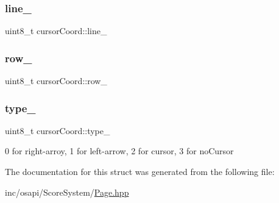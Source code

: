 \mbox{\label{structcursor_coord_a96ae7079d4b13f2db265984e8bdfaea7}} 
\subsubsection{\texorpdfstring{line\+\_\+}{line\_}}
{\footnotesize\ttfamily uint8\+\_\+t cursor\+Coord\+::line\+\_\+}

\mbox{\label{structcursor_coord_adcbf204f25eb1f04a1cde76228262126}} 
\subsubsection{\texorpdfstring{row\+\_\+}{row\_}}
{\footnotesize\ttfamily uint8\+\_\+t cursor\+Coord\+::row\+\_\+}

\mbox{\label{structcursor_coord_a2da066bc6d678bf94b30106524cb11ef}} 
\subsubsection{\texorpdfstring{type\+\_\+}{type\_}}
{\footnotesize\ttfamily uint8\+\_\+t cursor\+Coord\+::type\+\_\+}



0 for right-\/arroy, 1 for left-\/arrow, 2 for cursor, 3 for no\+Cursor 



The documentation for this struct was generated from the following file\+:\begin{DoxyCompactItemize}
\item 
inc/osapi/\+Score\+System/\hyperlink{_page_8hpp}{Page.\+hpp}\end{DoxyCompactItemize}
